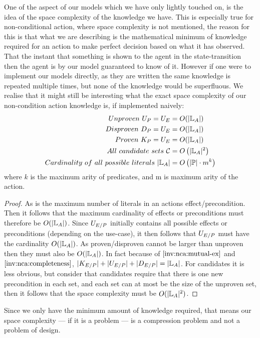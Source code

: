 \documentclass[../Master.tex]{subfiles}
\begin{document}
One of the aspect of our models which we have only lightly touched on, is the idea of the space complexity of the knowledge we have.
This is especially true for non-conditional action, where space complexity is not mentioned, 
the reason for this is that what we are describing is the mathematical minimum of knowledge required for an action to make perfect decision based on what it has observed.
That the instant that something is shown to the agent in the state-transition then the agent is by our model guaranteed to know of it.
However if one were to implement our models directly, as they are written the same knowledge is repeated multiple times, but none of the knowledge would be superfluous.
We realise that it might still be interesting what the exact space complexity of our non-condition action knowledge is, if implemented naively:
 \begin{align*}
 	Unproven ~U_P = U_E & = O(|\mathbb{L}_A|) \\
 	Disproven~D_P = U_E & = O(|\mathbb{L}_A|) \\
 	Proven~K_P = U_E &= O(|\mathbb{L}_A|) \\
 	All ~ candidate~sets~ \mathcal{C} & = O\left(|\mathbb{L}_A|^2\right) \\
    Cardinality~ of ~all~ possible~ literals  ~ |\mathbb{L}_A| & = O \left( |\mathbb{P}| \cdot m ^k \right) \\
 \end{align*} 
 where $k$ is the maximum arity of predicates, and m is maximum arity of the action.
 \begin{proof} 
 	As \litsa is the maximum number of literals in an actions effect/precondition. Then
 	it follows that the maximum cardinality of effects or preconditions must therefore be $O(|\mathbb{L}_A|)$.
Since $U_{E/P}$ initially contains all possible effects or preconditions (depending on the use-case), 
	it then follows that $U_{E/P}$ must have the cardinality $O(|\mathbb{L}_A|)$. 
	As proven/disproven cannot be larger than unproven then they must also be $O(|\mathbb{L}_A|)$.
	In fact because of $\Cref{inv:nca:mutual-ex}$ and $\Cref{inv:nca:completeness}$, $|K_{E/P}|+|U_{E/P}|+|D_{E/P}| = |\mathbb{L}_A|$.
	For candidates it is less obvious, but consider that candidates require that there is one new precondition in
	each set, and each set can at most be the size of the unproven set, then it follows that the space complexity must be $O(|\mathbb{L}_A|^2)$.
 \end{proof}
Since we only have the minimum amount of knowledge required, that means our space complexity --- if it is a problem --- is a compression problem and not a problem of design. 
\end{document}
